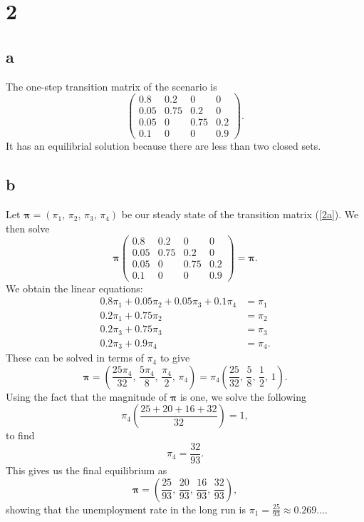\documentclass{article}
\begin{document}
\section{2}
\subsection{a}
The one-step transition matrix of the scenario is 
\begin{equation}
    \begin{pmatrix}
        0.8 & 0.2 & 0 & 0 \\
        0.05 & 0.75 & 0.2 & 0 \\
        0.05 & 0 & 0.75 & 0.2 \\
        0.1 & 0 & 0 & 0.9 
    \end{pmatrix}.\label{2a}
\end{equation}
It has an equilibrial solution because there are less than two closed sets.

\subsection{b}
Let $\mathbf{\pi}=(\pi_1,\,\pi_2,\,\pi_3,\,\pi_4)$ be our steady state of the transition matrix (\ref{2a}). We then solve
\begin{equation}
    \mathbf{\pi}\begin{pmatrix}
        0.8 & 0.2 & 0 & 0 \\
        0.05 & 0.75 & 0.2 & 0 \\
        0.05 & 0 & 0.75 & 0.2 \\
        0.1 & 0 & 0 & 0.9 
    \end{pmatrix} = \mathbf{\pi}.
\end{equation}
We obtain the linear equations:
\begin{align}
    0.8\pi_1 + 0.05\pi_2 + 0.05\pi_3 + 0.1\pi_4 &= \pi_1 \\
    0.2\pi_1 + 0.75\pi_2 &= \pi_2 \\
    0.2\pi_3 + 0.75\pi_3 &= \pi_3 \\
    0.2\pi_3 + 0.9\pi_4 &= \pi_4.
\end{align}
These can be solved in terms of $\pi_4$ to give
\begin{equation}
    \mathbf{\pi} = \left(\frac{25\pi_4}{32},\,\frac{5\pi_4}{8},\,\frac{\pi_4}{2},\,\pi_4\right) = \pi_4\left( \frac{25}{32},\,\frac{5}{8},\,\frac{1}{2},\,1 \right).
\end{equation}
Using the fact that the magnitude of $\mathbf{\pi}$ is one, we solve the following
\begin{equation}
    \pi_4\left( \frac{25 + 20 + 16 + 32}{32} \right) = 1,
\end{equation}
to find
\begin{equation}
    \pi_4 = \frac{32}{93}.
\end{equation}
This gives us the final equilibrium as
\begin{equation}
    \mathbf{\pi} = \left( \frac{25}{93},\,\frac{20}{93},\,\frac{16}{93},\,\frac{32}{93} \right),
\end{equation}
showing that the unemployment rate in the long run is $\pi_1 = \frac{25}{93}\approx 0.269\ldots$.
\end{document}
